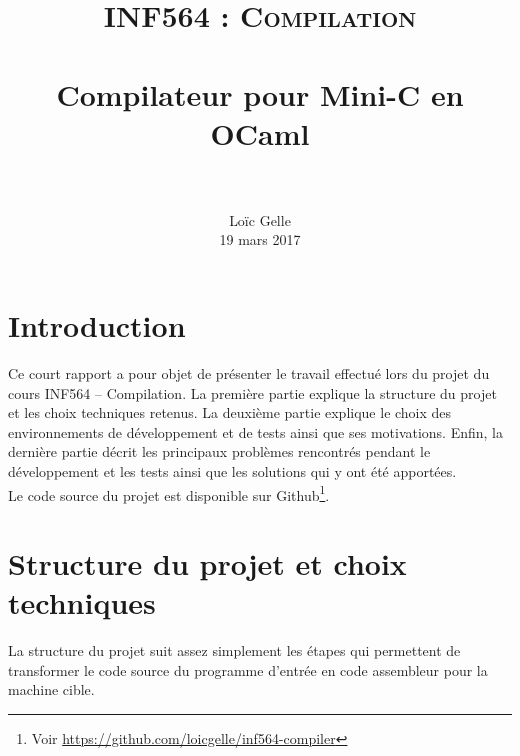 \documentclass[paper=a4, fontsize=11pt]{scrartcl}
\title{	
		\usefont{OT1}{bch}{b}{n}
		\normalfont \normalsize \textsc{INF564 : Compilation} \\ [25pt]
		\horrule{0.5pt} \\[0.4cm]
		\huge Compilateur pour Mini-C en OCaml \\
		\horrule{2pt} \\[0.5cm]
}
\author{
		\normalfont 								\normalsize
        Lo\"{i}c Gelle\\[-3pt]		\normalsize
        19 mars 2017
}
\date{}
\numberwithin{figure}{section}			%
\numberwithin{table}{section}				%
\begin{document}
\maketitle
\section{Introduction}

Ce court rapport a pour objet de présenter le travail effectué lors du projet du cours INF564 -- Compilation. La première partie explique la structure du projet et les choix techniques retenus. La deuxième partie explique le choix des environnements de développement et de tests ainsi que ses motivations. Enfin, la dernière partie décrit les principaux problèmes rencontrés pendant le développement et les tests ainsi que les solutions qui y ont été apportées. \\

Le code source du projet est disponible sur Github\footnote{Voir \url{https://github.com/loicgelle/inf564-compiler}}.

\section{Structure du projet et choix techniques}

La structure du projet suit assez simplement les étapes qui permettent de transformer le code source du programme d'entrée en code assembleur pour la machine cible.
\end{document}
